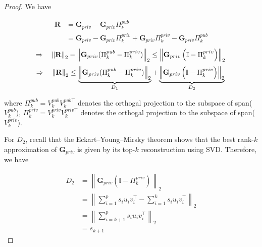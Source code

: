 \documentclass[11pt]{article}
\begin{document}
\begin{proof} We have

\begin{equation}
\begin{aligned}
    \mathbf{R} &= \mathbf{G}_{p r i v}-\mathbf{G}_{p r i v} \Pi_k^{pub} \\
    &= \mathbf{G}_{p r i v} - \mathbf{G}_{p r i v}\Pi_k^{priv} + \mathbf{G}_{p r i v}\Pi_k^{priv} - \mathbf{G}_{p r i v} \Pi_k^{pub}
\end{aligned}
\end{equation}
\begin{equation}
\Rightarrow \quad\left\| \mathbf{R} \right\|_2 - \left\| \mathbf{G}_{p r i v} (\Pi_k^{pub} - \Pi_k^{priv}) \right\|_2 \le \left\| \mathbf{G}_{p r i v}\left(\mathbb{I} - \Pi_k^{priv}\right)\right\|_2 \\
\end{equation}
\begin{equation}
\Rightarrow \quad\left\| \mathbf{R} \right\|_2 \le \underbrace{\left\| \mathbf{G}_{p r i v} (\Pi_k^{pub} - \Pi_k^{priv}) \right\|_2}_{D_1} + \underbrace{\left\| \mathbf{G}_{p r i v}\left(\mathbb{I} - \Pi_k^{priv}\right)\right\|_2}_{D_2} \\
\end{equation}

where $\Pi_k^{pub} = V_k^{p u b} V_k^{p u b \top}$ denotes the orthogal projection to the subspace of span($V_k^{p u b}$), $\Pi_k^{priv} = V_k^{priv} V_k^{priv \top}$ denotes the orthogal projection to the subspace of span($V_k^{priv}$).

For $D_2$, recall that the Eckart–Young–Mirsky theorem \cite{young} shows that the best rank-$k$ approximation of $\mathbf{G}_{p r i v}$ is given by its top-$k$ reconstruction using SVD. Therefore, we have

\begin{equation}
\begin{aligned}
    D_2 &= \left\| \mathbf{G}_{p r i v}\left(\mathbb{I} - \Pi_k^{priv}\right)\right\|_2 \\
    & = \left\|\sum_{i=1}^p s_i u_i v_i^{\top}-\sum_{i=1}^k s_i u_i v_i^{\top}\right\|_2 \\
    & =\left\|\sum_{i=k+1}^p s_i u_i v_i^{\top}\right\|_2 \\
    & = s_{k + 1}
\end{aligned}
\end{equation}


\end{proof}
\end{document}
